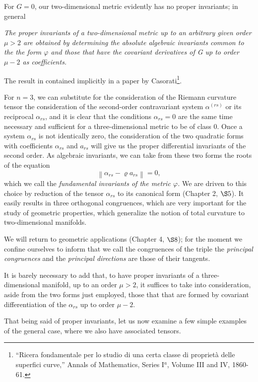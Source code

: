 \documentclass{book}
\begin{document}
For $G=0$, our two-dimensional metric evidently has no proper invariants; in general

\emph{The proper invariants of a two-dimensional metric up to an arbitrary given order $\mu>2$ are obtained by determining the absolute algebraic invariants common to the the form $\varphi$ and those that have the covariant derivatives of G up to order $\mu-2$ as coefficients.}

The result in contained implicitly in a paper by Casorati\footnote{``Ricera fondamentale per lo studio di una certa classe di propriet\`a delle superfici curve,'' Annals of Mathematics, Series I$^a$, Volume III and IV, 1860-61.}.

For $n=3$, we can substitute for the consideration of the Riemann curvature tensor the consideration of the second-order contravariant system $\alpha^{(rs)}$ or its reciprocal $\alpha_{rs}$, and it is clear that the conditions $\alpha_{rs}=0$ are the same time necessary and sufficient for a three-dimensional metric to be of class 0. Once a system $\alpha_{rs}$ is not identically zero, the consideration of the two quadratic forms with coefficients $\alpha_{rs}$ and $a_{rs}$ will give us the proper differential invariants of the second order. As algebraic invariants, we can take from these two forms the roots of the equation
$$\left\|\alpha_{rs}-\varrho a_{rs}\right\|=0,$$
which we call the \emph{fundamental invariants of the metric $\varphi$.} We are driven to this choice by reduction of the tensor $\alpha_{rs}$ to its canonical form (Chapter 2, $\S5$). It easily results in three orthogonal congruences, which are very important for the study of geometric properties, which generalize the notion of total curvature to two-dimensional manifolds. 

We will return to geometric applications (Chapter 4, $\S8$); for the moment we confine ourselves to inform that we call the congruences of the triple the \emph{principal congruences} and the \emph{principal directions} are those of their tangents. 

It is barely necessary to add that, to have proper invariants of a three-dimensional manifold, up to an order $\mu>2$, it suffices to take into consideration, aside from the two forms just employed, those that that are formed by covariant differentiation of the $\alpha_{rs}$ up to order $\mu-2$. 

That being said of proper invariants, let us now examine a few simple examples of the general case, where we also have associated tensors. 
\end{document}
